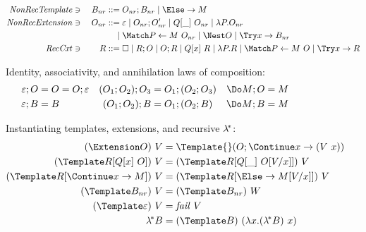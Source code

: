 \documentclass[runningheads]{llncs}
\begin{document}
\begin{figure}
\centering

\begin{align*}
  \mathit{NonRecTemplate} &\ni{}& B_{nr}
  &::= O_{nr}; B_{nr}
  \mid \Else \to M
  \\
  \mathit{NonRecExtension} &\ni{}& O_{nr}
  &::= \varepsilon
  \mid O_{nr}; O'_{nr}
  \mid Q[\_] ~ O_{nr}
  \mid \lambda P. O_{nr}
  \\
  &&&\phantom{:=}
  \mid \Match P \gets M ~ O_{nr}
  \mid \Nest O
  \mid \Try x \to B_{nr}
  \\
  \mathit{RecCxt} &\ni{}& R
  &::= \hole
  \mid R; O
  \mid O; R
  \mid Q[x] ~ R
  \mid \lambda P. R
  \mid \Match P \gets M ~ O
  \mid \Try x \to R
\end{align*}

Identity, associativity, and annihilation laws of composition:
\begin{align*}
  \varepsilon; O &= O = O; \varepsilon
  &
  (O_1; O_2); O_3 &= O_1; (O_2; O_3)
  &
  \Do M; O &= \do M
  \\
  \varepsilon; B &= B
  &
  (O_1; O_2); B &= O_1; (O_2; B)
  &
  \Do M; B &= \do M
\end{align*}



Instantiating templates, extensions, and recursive $\lambda^{\!*}$:
\begin{align*}
  (\Extension O) ~ V
  &=
  \Template{} (O; \Continue x \to (V ~ x))
  \\
  (\Template R[Q[x] ~ O]) ~ V
  &=
  (\Template R[Q[\_] ~ O\subst{x}{V}]) ~ V
  \\
  (\Template R[\Continue x \to M]) ~ V
  &=
  (\Template R[\Else \to M\subst{x}{V}]) ~ V
  \\
  (\Template B_{nr}) ~ V
  &=
  (\Template B_{nr}) ~ W
  \\
  (\Template \varepsilon) ~ V
  &=
  \mathit{fail}~V
  \\
  \lamstar B
  &=
  (\Template B) ~ (\lambda x. (\lamstar B) ~ x)
\end{align*}


\end{figure}
\end{document}
